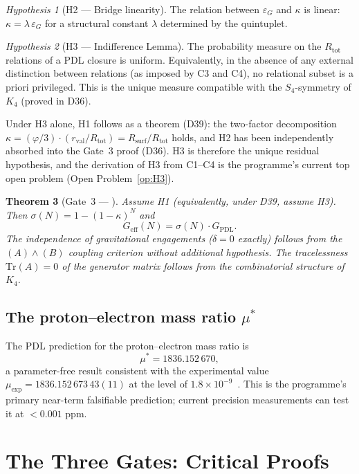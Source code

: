 \documentclass[11pt,a4paper]{article}
\theoremstyle{plain}
\newtheorem{theorem}{Theorem}[section]
\theoremstyle{definition}
\theoremstyle{remark}
\newtheorem{hypothesis}[theorem]{Hypothesis}
\newcommand{\Kfour}{K_4}
\newcommand{\Geff}{G_{\mathrm{eff}}}
\newcommand{\GPDL}{G_{\mathrm{PDL}}}
\newcommand{\epsG}{\varepsilon_G}
\newcommand{\rval}{r_{\mathrm{val}}}
\newcommand{\Rsurf}{R_{\mathrm{surf}}}
\newcommand{\Rtot}{R_{\mathrm{tot}}}
\newcommand{\mustar}{\mu^*}
\begin{document}
\begin{hypothesis}[H2 — Bridge linearity]
The relation between $\epsG$ and $\kappa$ is linear: $\kappa = \lambda\,\epsG$ for a structural constant $\lambda$ determined by the quintuplet.
\end{hypothesis}

\begin{hypothesis}[H3 — Indifference Lemma]
The probability measure on the $\Rtot$ relations of a PDL closure is uniform.
Equivalently, in the absence of any external distinction between relations (as imposed by C3 and C4), no relational subset is a priori privileged.
This is the unique measure compatible with the $S_4$-symmetry of $\Kfour$ (proved in D36).
\end{hypothesis}

Under H3 alone, H1 follows as a theorem (D39): the two-factor decomposition $\kappa = (\varphi/3)\cdot(\rval/\Rtot) = \Rsurf/\Rtot$ holds, and H2 has been independently absorbed into the Gate~3 proof (D36).
H3 is therefore the unique residual hypothesis, and the derivation of H3 from C1--C4 is the programme's current top open problem (Open Problem~\ref{op:H3}).

\begin{theorem}[Gate~3 — \citep{D36}]
\label{thm:Gate3}
Assume H1 (equivalently, under D39, assume H3).
Then $\sigma(N) = 1-(1-\kappa)^N$ and
\[
\Geff(N) = \sigma(N)\cdot\GPDL.
\]
The independence of gravitational engagements ($\delta=0$ exactly) follows from the $(A)\wedge(B)$ coupling criterion without additional hypothesis.
The tracelessness $\mathrm{Tr}(A)=0$ of the generator matrix follows from the combinatorial structure of $\Kfour$.
\end{theorem}

\subsection{The proton--electron mass ratio \texorpdfstring{$\mustar$}{mu*}}
\label{subsec:mu}

The PDL prediction for the proton--electron mass ratio is
\[
\mustar = 1836.152\,670,
\]
a parameter-free result consistent with the experimental value $\mu_{\exp}=1836.152\,673\,43(11)$ at the level of $1.8\times 10^{-9}$~\citep{D28,D29,D30}.
This is the programme's primary near-term falsifiable prediction; current precision measurements can test it at $<0.001$ ppm.

\section{The Three Gates: Critical Proofs}
\label{sec:gates}
\end{document}
